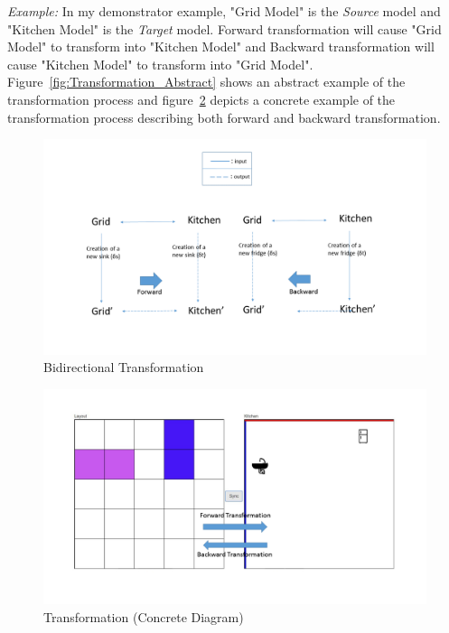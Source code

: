 \textit{Example:} In my demonstrator example, "Grid Model" is the \textit{Source} model and "Kitchen Model" is the \textit{Target} model. Forward transformation will cause "Grid Model" to transform into "Kitchen Model" and Backward transformation will cause "Kitchen Model" to transform into "Grid Model". Figure~\ref{fig:Transformation_Abstract} shows an abstract example of the transformation process and figure~\ref{fig:Transformation_Concrete} depicts a concrete example of the transformation process describing both forward and backward transformation.\\

\begin{figure}
	\includegraphics[width=1\textwidth]{figures/BX}
	\caption{Bidirectional Transformation}
	\label{fig:BX_Diagram}
\end{figure}

\begin{figure}
	\includegraphics[width=1\textwidth]{figures/Transformation_Concrete}
	\caption{Transformation (Concrete Diagram)}
	\label{fig:Transformation_Concrete}
\end{figure}